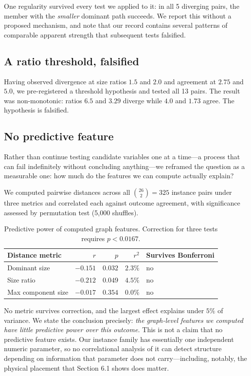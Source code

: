 \documentclass[11pt]{article}
\begin{document}
One regularity survived every test we applied to it: in all 5 diverging
pairs, the member with the \emph{smaller} dominant path succeeds. We
report this without a proposed mechanism, and note that our record
contains several patterns of comparable apparent strength that
subsequent tests falsified.

\subsection{A ratio threshold, falsified}

Having observed divergence at size ratios $1.5$ and $2.0$ and agreement
at $2.75$ and $5.0$, we pre-registered a threshold hypothesis and
tested all 13 pairs. The result was non-monotonic: ratios $6.5$ and
$3.29$ diverge while $4.0$ and $1.73$ agree. The hypothesis is
falsified.

\subsection{No predictive feature}

Rather than continue testing candidate variables one at a time---a
process that can fail indefinitely without concluding anything---we
reframed the question as a measurable one: how much do the features we
can compute actually explain?

We computed pairwise distances across all $\binom{26}{2} = 325$
instance pairs under three metrics and correlated each against outcome
agreement, with significance assessed by permutation test
(5,000 shuffles).

\begin{table}[h]
\centering
\begin{tabular}{lrrrl}
\toprule
Distance metric & $r$ & $p$ & $r^2$ & Survives Bonferroni \\
\midrule
Dominant size & $-0.151$ & $0.032$ & $2.3\%$ & no \\
Size ratio & $-0.212$ & $0.049$ & $4.5\%$ & no \\
Max component size & $-0.017$ & $0.354$ & $0.0\%$ & no \\
\bottomrule
\end{tabular}
\caption{Predictive power of computed graph features. Correction for
three tests requires $p < 0.0167$.}
\label{tab:mantel}
\end{table}

No metric survives correction, and the largest effect explains under
$5\%$ of variance. We state the conclusion precisely: \emph{the
graph-level features we computed have little predictive power over this
outcome.} This is not a claim that no predictive feature exists. Our
instance family has essentially one independent numeric parameter, so
no correlational analysis of it can detect structure depending on
information that parameter does not carry---including, notably, the
physical placement that Section 6.1 shows does matter.
\end{document}

